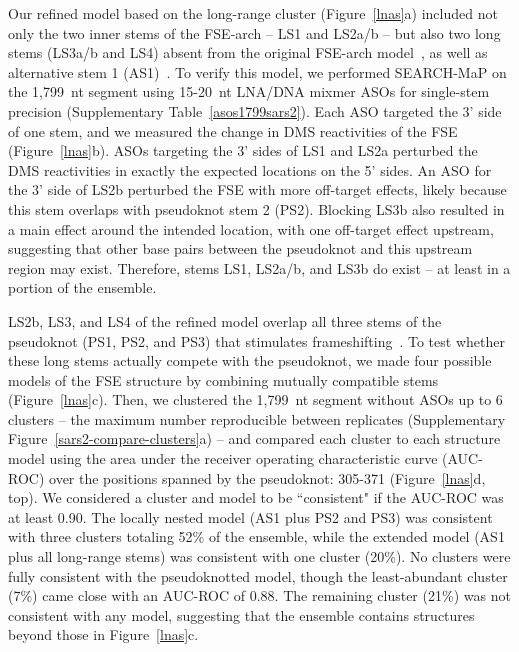 \documentclass[main.tex]{subfiles}
\begin{document}
Our refined model based on the long-range cluster (Figure~\ref{lnas}a) included not only the two inner stems of the FSE-arch -- LS1 and LS2a/b -- but also two long stems (LS3a/b and LS4) absent from the original FSE-arch model~\cite{Ziv2020}, as well as alternative stem 1 (AS1)~\cite{Lan2022}.
To verify this model, we performed SEARCH-MaP on the 1,799~nt segment using 15-20~nt LNA/DNA mixmer ASOs for single-stem precision (Supplementary Table~\ref{asos1799sars2}).
Each ASO targeted the 3' side of one stem, and we measured the change in DMS reactivities of the FSE (Figure~\ref{lnas}b).
ASOs targeting the 3' sides of LS1 and LS2a perturbed the DMS reactivities in exactly the expected locations on the 5' sides.
An ASO for the 3' side of LS2b perturbed the FSE with more off-target effects, likely because this stem overlaps with pseudoknot stem 2 (PS2).
Blocking LS3b also resulted in a main effect around the intended location, with one off-target effect upstream, suggesting that other base pairs between the pseudoknot and this upstream region may exist.
Therefore, stems LS1, LS2a/b, and LS3b do exist -- at least in a portion of the ensemble.

LS2b, LS3, and LS4 of the refined model overlap all three stems of the pseudoknot (PS1, PS2, and PS3) that stimulates frameshifting~\cite{KZhang2021}.
To test whether these long stems actually compete with the pseudoknot, we made four possible models of the FSE structure by combining mutually compatible stems (Figure~\ref{lnas}c).
Then, we clustered the 1,799~nt segment without ASOs up to 6 clusters -- the maximum number reproducible between replicates (Supplementary Figure~\ref{sars2-compare-clusters}a) -- and compared each cluster to each structure model using the area under the receiver operating characteristic curve (AUC-ROC) over the positions spanned by the pseudoknot: 305-371 (Figure~\ref{lnas}d, top).
We considered a cluster and model to be ``consistent" if the AUC-ROC was at least 0.90.
The locally nested model (AS1 plus PS2 and PS3) was consistent with three clusters totaling 52\% of the ensemble, while the extended model (AS1 plus all long-range stems) was consistent with one cluster (20\%).
No clusters were fully consistent with the pseudoknotted model, though the least-abundant cluster (7\%) came close with an AUC-ROC of 0.88.
The remaining cluster (21\%) was not consistent with any model, suggesting that the ensemble contains structures beyond those in Figure~\ref{lnas}c.
\end{document}
